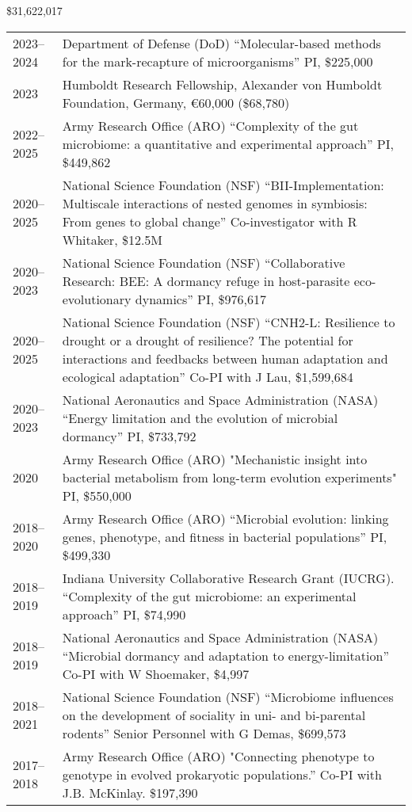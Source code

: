 \documentclass[11pt]{article}  %
\begin{document}
\$31,622,017


\vspace{-1.25em}
\noindent
\begin{tabularx}{\textwidth}{@{}l@{\hspace{2em}}X@{}}
2023--2024 & Department of Defense (DoD) “Molecular-based methods for the mark-recapture of microorganisms” PI, \$225,000 \\
2023 & Humboldt Research Fellowship, Alexander von Humboldt Foundation, Germany, €60,000 (\$68,780) \\
2022--2025 & Army Research Office (ARO) “Complexity of the gut microbiome: a quantitative and experimental approach” PI, \$449,862 \\
2020--2025 & National Science Foundation (NSF) “BII-Implementation: Multiscale interactions of nested genomes in symbiosis: From genes to global change” Co-investigator with R Whitaker, \$12.5M \\
2020--2023 & National Science Foundation (NSF) “Collaborative Research: BEE: A dormancy refuge in host-parasite eco-evolutionary dynamics” PI, \$976,617 \\
2020--2025 & National Science Foundation (NSF) “CNH2-L: Resilience to drought or a drought of resilience? The potential for interactions and feedbacks between human adaptation and ecological adaptation” Co-PI with J Lau, \$1,599,684 \\
2020--2023 & National Aeronautics and Space Administration (NASA) “Energy limitation and the evolution of microbial dormancy” PI, \$733,792 \\
2020 & Army Research Office (ARO) "Mechanistic insight into bacterial metabolism from long-term evolution experiments" PI, \$550,000 \\
2018--2020 & Army Research Office (ARO) “Microbial evolution: linking genes, phenotype, and fitness in bacterial populations” PI, \$499,330 \\
2018--2019 & Indiana University Collaborative Research Grant (IUCRG). “Complexity of the gut microbiome: an experimental approach” PI, \$74,990 \\
2018--2019 & National Aeronautics and Space Administration (NASA) “Microbial dormancy and adaptation to energy-limitation” Co-PI with W Shoemaker, \$4,997 \\
2018--2021 & National Science Foundation (NSF) “Microbiome influences on the development of sociality in uni- and bi-parental rodents” Senior Personnel with G Demas, \$699,573 \\
2017--2018 & Army Research Office (ARO) "Connecting phenotype to genotype in evolved prokaryotic populations.” Co-PI with J.B. McKinlay. \$197,390 \\

\end{tabularx}
\end{document}
